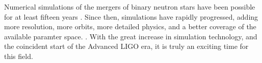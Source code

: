 Numerical simulations of the mergers of binary neutron stars have been possible for at least fifteen years . Since then, simulations have rapidly progressed, adding more resolution, more orbits, more detailed physics, and a better coverage of the available paramter space. . With the great increase in simulation technology, and the coincident start of the Advanced LIGO era, it is truly an exciting time for this field.




